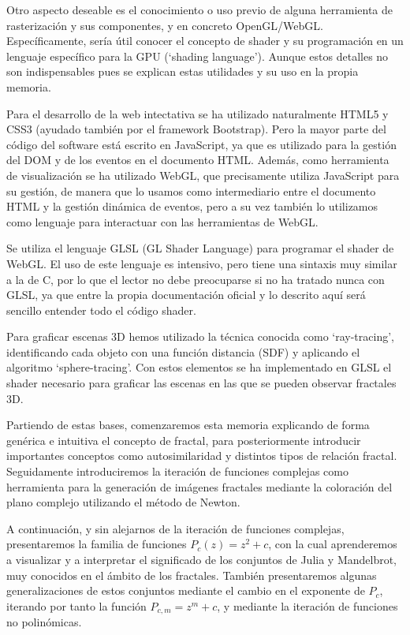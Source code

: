 Otro aspecto deseable es el conocimiento o uso previo de alguna herramienta de rasterización y sus componentes, y en concreto OpenGL/WebGL. Específicamente, sería útil conocer el concepto de shader y su programación en un lenguaje específico para la GPU (`shading language'). Aunque estos detalles no son indispensables pues se explican estas utilidades y su uso en la propia memoria. 

Para el desarrollo de la web intectativa se ha utilizado naturalmente HTML5 y CSS3 (ayudado también por el framework Bootstrap). Pero la mayor parte del código del software está escrito en JavaScript, ya que es utilizado para la gestión del DOM y de los eventos en el documento HTML. Además, como herramienta de visualización se ha utilizado WebGL, que precisamente utiliza JavaScript para su gestión, de manera que lo usamos como intermediario entre el documento HTML y la gestión dinámica de eventos, pero a su vez también lo utilizamos como lenguaje para interactuar con las herramientas de WebGL.

Se utiliza el lenguaje GLSL (GL Shader Language) para programar el shader de WebGL. El uso de este lenguaje es intensivo, pero tiene una sintaxis muy similar a la de C, por lo que el lector no debe preocuparse si no ha tratado nunca con GLSL, ya que entre la propia documentación oficial y lo descrito aquí será sencillo entender todo el código shader.

Para graficar escenas 3D hemos utilizado la técnica conocida como `ray-tracing', identificando cada objeto con una función distancia (SDF) y aplicando el algoritmo `sphere-tracing'. Con estos elementos se ha implementado en GLSL el shader necesario para graficar las escenas en las que se pueden observar fractales 3D.

Partiendo de estas bases, comenzaremos esta memoria explicando de forma genérica e intuitiva el concepto de fractal, para posteriormente introducir importantes conceptos como autosimilaridad y distintos tipos de relación fractal. Seguidamente introduciremos la iteración de funciones complejas como herramienta para la generación de imágenes fractales mediante la coloración del plano complejo utilizando el método de Newton.

A continuación, y sin alejarnos de la iteración de funciones complejas, presentaremos la familia de funciones $P_c(z)=z^2+c$, con la cual aprenderemos a visualizar y a interpretar el significado de los conjuntos de Julia y Mandelbrot, muy conocidos en el ámbito de los fractales. También presentaremos algunas generalizaciones de estos conjuntos mediante el cambio en el exponente de $P_c$, iterando por tanto la función $P_{c,m}=z^m+c$, y mediante la iteración de funciones no polinómicas.

